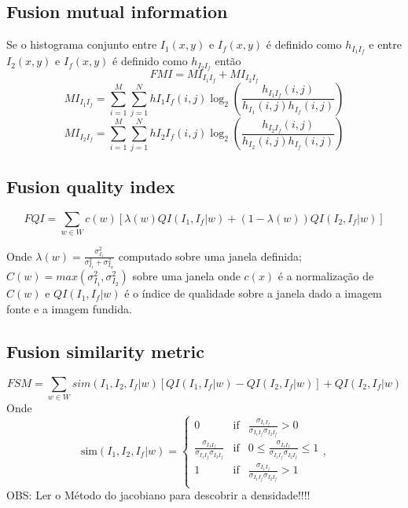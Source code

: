 \documentclass[conference]{IEEEtran}
\begin{document}
\subsection{Fusion mutual information}
Se o histograma conjunto entre $I_1(x,y)$ e $I_f(x,y)$ é definido como $h_{I_1I_f}$ e entre $I_2(x,y)$ e $I_f(x,y)$ é definido como $h_{I_2I_f}$ então
\begin{equation}
FMI = MI_{I_1I_f}+MI_{I_2I_f}
\end{equation}
$$MI_{I_1I_f}= \sum_{i=1}^M\sum_{j=1}^N h{I_1I_f}(i,j)\log_2\left(\frac{h_{I_1I_f}(i,j)}{h_{I_1}(i,j)h_{I_f}(i,j)} \right)$$
$$MI_{I_2I_f}= \sum_{i=1}^M\sum_{j=1}^N h{I_2I_f}(i,j)\log_2\left(\frac{h_{I_2I_f}(i,j)}{h_{I_2}(i,j)h_{I_f}(i,j)} \right)$$
\subsection{Fusion quality index}
\begin{equation}
FQI = \sum_{w\in W}c(w)[\lambda(w)QI(I_1,I_f|w)+(1-\lambda(w))QI(I_2,I_f|w)] 
\end{equation}

Onde $\lambda(w)=\frac{\sigma_{I_1}^2}{\sigma_{I_1}^2+\sigma_{I_w}^2}$ computado sobre uma janela definida; $C(w)=max(\sigma_{I_1}^2,\sigma_{I_2}^2)$ sobre uma janela onde $c(x)$ é a normalização de $C(w)$ e $QI(I_1,I_f|w)$ é o índice de qualidade sobre a janela dado a imagem fonte e a imagem fundida.
\subsection{Fusion similarity metric}
\begin{equation}
FSM = \sum_{w\in W} sim(I_1,I_2,I_f|w)[QI(I_1,I_f|w)-QI(I_2,I_f|w)]+QI(I_2,I_f|w) 
\end{equation}
Onde
\begin{equation}
\text{sim}(I_1,I_2,I_f|w) = \left\{
\begin{array}{ccc}
    0   & \text{if} &  \frac{\sigma_{I_1I_f}}{\sigma_{I_1I_f}\sigma_{I_2I_f}} > 0  \\
    \frac{\sigma_{I_1I_f}}{\sigma_{I_1I_f}\sigma_{I_2I_f}}  & \text{if} &  0\le \frac{\sigma_{I_1I_f}}{\sigma_{I_1I_f}\sigma_{I_2I_f}} \le 1  \\
        1   & \text{if} &  \frac{\sigma_{I_1I_f}}{\sigma_{I_1I_f}\sigma_{I_2I_f}} > 1  \\
\end{array}
\right.,
\end{equation}
OBS: Ler o Método do jacobiano para descobrir a densidade!!!! 


\end{document}
